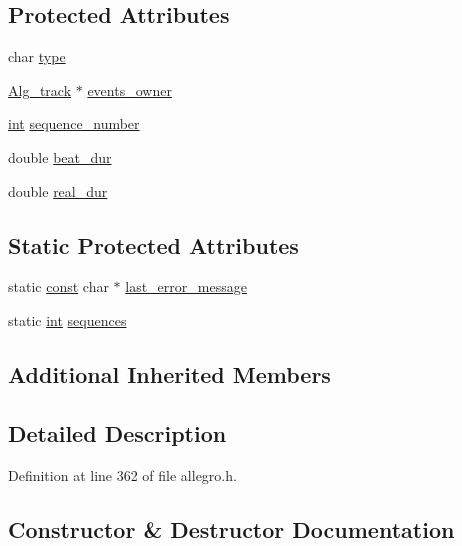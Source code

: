 \subsection*{Protected Attributes}
\begin{DoxyCompactItemize}
\item 
char \hyperlink{class_alg__event__list_a9ab980471417c440b1d62385c4d686f7}{type}
\item 
\hyperlink{class_alg__track}{Alg\+\_\+track} $\ast$ \hyperlink{class_alg__event__list_a3aa639ce336e0f192730bb0d6cc52aef}{events\+\_\+owner}
\item 
\hyperlink{xmltok_8h_a5a0d4a5641ce434f1d23533f2b2e6653}{int} \hyperlink{class_alg__event__list_a23063c9dafd7ddec6ac72016dfb9056f}{sequence\+\_\+number}
\item 
double \hyperlink{class_alg__event__list_aa56d4cf13bcc9093ad7604c1274dc7d9}{beat\+\_\+dur}
\item 
double \hyperlink{class_alg__event__list_af6a2f1a4d814d60dcc8c2abf17b79b53}{real\+\_\+dur}
\end{DoxyCompactItemize}
\subsection*{Static Protected Attributes}
\begin{DoxyCompactItemize}
\item 
static \hyperlink{getopt1_8c_a2c212835823e3c54a8ab6d95c652660e}{const} char $\ast$ \hyperlink{class_alg__event__list_a1539cf3d6dd2b752986c748a5b8c4dd2}{last\+\_\+error\+\_\+message}
\item 
static \hyperlink{xmltok_8h_a5a0d4a5641ce434f1d23533f2b2e6653}{int} \hyperlink{class_alg__event__list_a60130bda985a5ac5321ad803fcea570d}{sequences}
\end{DoxyCompactItemize}
\subsection*{Additional Inherited Members}


\subsection{Detailed Description}


Definition at line 362 of file allegro.\+h.



\subsection{Constructor \& Destructor Documentation}
